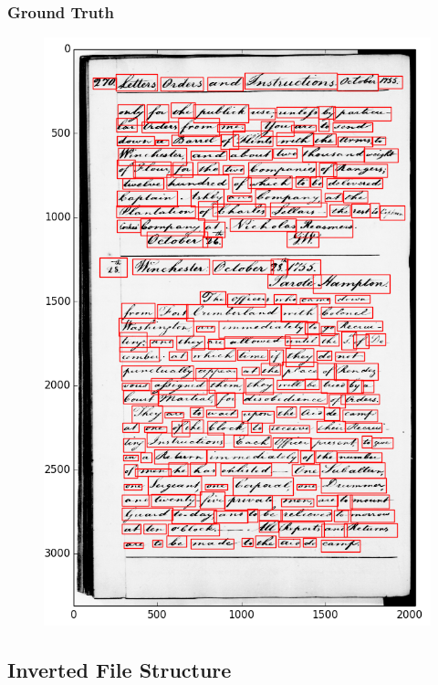 \documentclass[9pt]{beamer}
\begin{document}
			\begin{frame}
				\frametitle{Ground Truth}
				\begin{figure}
					\centering
					\includegraphics[scale=0.18]{Images/GT.png}
				\end{figure}
			\end{frame}
			
		\subsection{Inverted File Structure}
		
\end{document}
